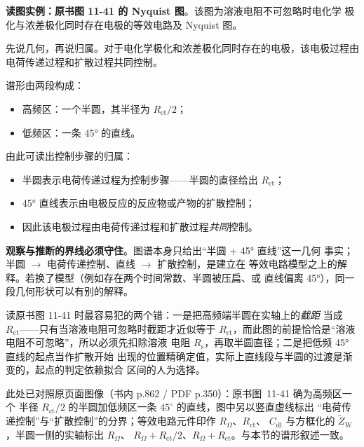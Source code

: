\begin{crosscheck}
\textbf{读图实例：原书图 11-41 的 Nyquist 图}。该图为溶液电阻不可忽略时电化学
极化与浓差极化同时存在电极的等效电路及 Nyquist 图。

先说几何，再说归属。对于电化学极化和浓差极化同时存在的电极，该电极过程由
电荷传递过程和扩散过程共同控制。
\end{crosscheck}

\begin{obs}
谱形由两段构成：

\begin{itemize}
  \item 高频区：一个半圆，其半径为 $R_\mathrm{ct}/2$；
  \item 低频区：一条 45° 的直线。
\end{itemize}
\end{obs}

\begin{infer}
由此可读出控制步骤的归属：

\begin{itemize}
  \item 半圆表示电荷传递过程为控制步骤——半圆的直径给出 $R_\mathrm{ct}$；
  \item 45° 直线表示由电极反应的反应物或产物的扩散控制；
  \item 因此该电极过程由电荷传递过程和扩散过程\emph{共同}控制。
\end{itemize}
\end{infer}

\begin{crosscheck}
\textbf{观察与推断的界线必须守住}。图谱本身只给出“半圆 + 45° 直线”这一几何
事实；半圆 $\rightarrow$ 电荷传递控制、直线 $\rightarrow$ 扩散控制，是建立在
等效电路模型之上的解释。若换了模型（例如存在两个时间常数、半圆被压扁、或
直线偏离 45°），同一段几何形状可以有别的解释。
\end{crosscheck}

\begin{pitfall}
读原书图 11-41 时最容易犯的两个错：一是把高频端半圆在实轴上的\emph{截距}
当成 $R_\mathrm{ct}$——只有当溶液电阻可忽略时截距才近似等于
$R_\mathrm{ct}$，而此图的前提恰恰是“溶液电阻不可忽略”，所以必须先扣除溶液
电阻 $R_\mathrm{s}$，再取半圆直径；二是把低频 45° 直线的起点当作扩散开始
出现的位置精确定值，实际上直线段与半圆的过渡是渐变的，起点的判定依赖拟合
区间的人为选择。
\end{pitfall}

此处已对照原页面图像（书内 p.862 / PDF p.350）：原书图~11-41 确为高频区一个
半径 $R_\mathrm{ct}/2$ 的半圆加低频区一条 $45^\circ$ 的直线，图中另以竖直虚线标出
“电荷传递控制”与“扩散控制”的分界；等效电路元件印作 $R_\Omega$、$R_\mathrm{ct}$、
$C_\mathrm{dl}$ 与方框化的 $\tilde Z_\mathrm{W}$，半圆一侧的实轴标出 $R_\Omega$、
$R_\Omega+R_\mathrm{ct}/2$、$R_\Omega+R_\mathrm{ct}$。与本节的谱形叙述一致。

